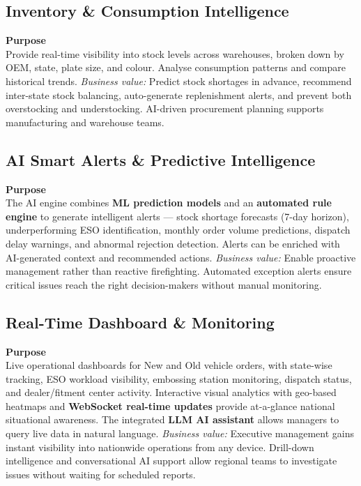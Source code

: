 \documentclass[11pt,a4paper]{article}
\newcommand{\capblock}[3]{%
    \vspace{0.25em}
    \noindent\textbf{#1}\\[0.15em]
    #2
    \vspace{0.2em}
    \noindent\textit{Business value:} #3
    \vspace{0.35em}
}
\begin{document}
\subsection{Inventory \& Consumption Intelligence}

\capblock{Purpose}{%
Provide real-time visibility into stock levels across warehouses, broken down by OEM, state, plate size, and colour. Analyse consumption patterns and compare historical trends.}{%
Predict stock shortages in advance, recommend inter-state stock balancing, auto-generate replenishment alerts, and prevent both overstocking and understocking. AI-driven procurement planning supports manufacturing and warehouse teams.}

\subsection{AI Smart Alerts \& Predictive Intelligence}

\capblock{Purpose}{%
The AI engine combines \textbf{ML prediction models} and an \textbf{automated rule engine} to generate intelligent alerts --- stock shortage forecasts (7-day horizon), underperforming ESO identification, monthly order volume predictions, dispatch delay warnings, and abnormal rejection detection. Alerts can be enriched with AI-generated context and recommended actions.}{%
Enable proactive management rather than reactive firefighting. Automated exception alerts ensure critical issues reach the right decision-makers without manual monitoring.}

\subsection{Real-Time Dashboard \& Monitoring}

\capblock{Purpose}{%
Live operational dashboards for New and Old vehicle orders, with state-wise tracking, ESO workload visibility, embossing station monitoring, dispatch status, and dealer/fitment center activity. Interactive visual analytics with geo-based heatmaps and \textbf{WebSocket real-time updates} provide at-a-glance national situational awareness. The integrated \textbf{LLM AI assistant} allows managers to query live data in natural language.}{%
Executive management gains instant visibility into nationwide operations from any device. Drill-down intelligence and conversational AI support allow regional teams to investigate issues without waiting for scheduled reports.}
\end{document}
